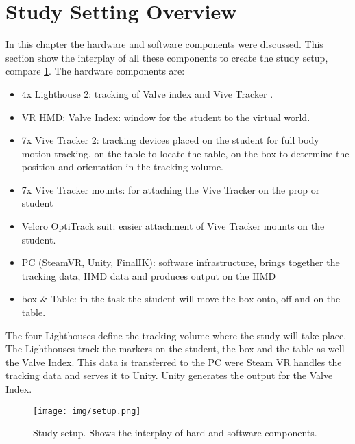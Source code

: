 \section{Study Setting Overview}
In this chapter the hardware and software components were discussed. This section show the interplay of all these components to create the study setup, compare \ref{fig:setup}.
The hardware components are:
\begin{itemize}
	\item 4x Lighthouse 2: tracking of Valve index and Vive Tracker .
	\item VR HMD: Valve Index: window for the student to the virtual world.
	\item 7x Vive Tracker 2: tracking devices placed on the student for full body motion tracking, on the table to locate the table, on the box to determine the position and orientation in the tracking volume.
	\item 7x Vive Tracker mounts: for attaching the Vive Tracker on the prop or student
	\item Velcro OptiTrack suit: easier attachment of Vive Tracker mounts on the student.
	\item PC (SteamVR, Unity, FinalIK): software infrastructure, brings together the tracking data, HMD data and produces output on the HMD
	\item box \& Table: in the task the student will move the box onto, off and on the table.
\end{itemize}
The four Lighthouses define the tracking volume where the study will take place. The Lighthouses track the markers on the student, the box and the table as well the Valve Index. This data is transferred to the PC were Steam VR handles the tracking data and serves it to Unity. Unity generates the output for the Valve Index.
\begin{figure}
	\centering
	\texttt{[image: img/setup.png]}
	\caption{Study setup. Shows the interplay of hard and software components.}
	\label{fig:setup}
\end{figure}
